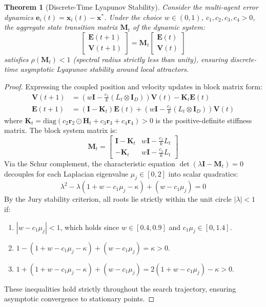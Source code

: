 \documentclass[journal]{IEEEtran}
\newtheorem{theorem}{Theorem}
\begin{document}
\begin{theorem}[Discrete-Time Lyapunov Stability]
\label{thm:lyapunov}
Consider the multi-agent error dynamics $\mathbf{e}_i(t) = \mathbf{x}_i(t) - \mathbf{x}^*$. Under the choice $w \in (0, 1)$, $c_1, c_2, c_3, c_4 > 0$, the aggregate state transition matrix $\mathbf{M}_t$ of the dynamic system:
\begin{equation}
\begin{bmatrix} \mathbf{E}(t+1) \\ \mathbf{V}(t+1) \end{bmatrix} = \mathbf{M}_t \begin{bmatrix} \mathbf{E}(t) \\ \mathbf{V}(t) \end{bmatrix}
\end{equation}
satisfies $\rho(\mathbf{M}_t) < 1$ (spectral radius strictly less than unity), ensuring discrete-time asymptotic Lyapunov stability around local attractors.
\end{theorem}
\begin{proof}
Expressing the coupled position and velocity updates in block matrix form:
\begin{align}
\mathbf{V}(t+1) &= \left( w \mathbf{I} - \frac{c_1}{k} (L_t \otimes \mathbf{I}_D) \right) \mathbf{V}(t) - \mathbf{K}_t \mathbf{E}(t) \\
\mathbf{E}(t+1) &= (\mathbf{I} - \mathbf{K}_t) \mathbf{E}(t) + \left( w \mathbf{I} - \frac{c_1}{k} (L_t \otimes \mathbf{I}_D) \right) \mathbf{V}(t)
\end{align}
where $\mathbf{K}_t = \text{diag}(c_2 \mathbf{r}_2 \odot \mathbf{H}_t + c_3 \mathbf{r}_3 + c_4 \mathbf{r}_4) > 0$ is the positive-definite stiffness matrix.
The block system matrix is:
\begin{equation}
\mathbf{M}_t = \begin{bmatrix} \mathbf{I} - \mathbf{K}_t & w \mathbf{I} - \frac{c_1}{k} L_t \\ -\mathbf{K}_t & w \mathbf{I} - \frac{c_1}{k} L_t \end{bmatrix}
\end{equation}
Via the Schur complement, the characteristic equation $\det(\lambda \mathbf{I} - \mathbf{M}_t) = 0$ decouples for each Laplacian eigenvalue $\mu_j \in [0, 2]$ into scalar quadratics:
\begin{equation}
\lambda^2 - \lambda \left( 1 + w - c_1 \mu_j - \kappa \right) + (w - c_1 \mu_j) = 0
\end{equation}
By the Jury stability criterion, all roots lie strictly within the unit circle $|\lambda| < 1$ if:
\begin{enumerate}
    \item $|w - c_1 \mu_j| < 1$, which holds since $w \in [0.4, 0.9]$ and $c_1 \mu_j \in [0, 1.4]$.
    \item $1 - (1 + w - c_1 \mu_j - \kappa) + (w - c_1 \mu_j) = \kappa > 0$.
    \item $1 + (1 + w - c_1 \mu_j - \kappa) + (w - c_1 \mu_j) = 2(1 + w - c_1 \mu_j) - \kappa > 0$.
\end{enumerate}
These inequalities hold strictly throughout the search trajectory, ensuring asymptotic convergence to stationary points.
\end{proof}
\end{document}
